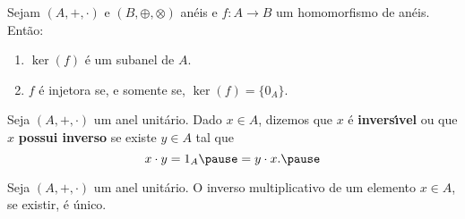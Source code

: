 \documentclass{beamer}
\begin{document}
    \begin{frame}
        \begin{proposicao}
            Sejam $(A, +, \cdot)$ e $(B, \oplus, \otimes)$ anéis \pause e $f : A \to B$ um homomorfismo de anéis. \pause Então:\pause
            \begin{enumerate}[label={\roman*})]
                \item $\ker(f)$ é um subanel de $A$.\pause

                \vspace{.5cm}

                \item $f$ é injetora \pause se, e somente se, \pause $\ker(f) = \{0_A\}$.\pause

                \vspace{.5cm}
            \end{enumerate}
        \end{proposicao}
    \end{frame}

    \begin{frame}
        \begin{definicao}
            Seja $(A, +, \cdot)$ um anel unitário. \pause Dado $x \in A$, \pause dizemos que $x$ é \textbf{invers{\'\i}vel} \pause ou que $x$ \textbf{possui inverso} \pause se existe $y \in A$ \pause tal que\pause
            \[
                x \cdot y = 1_A \pause = y \cdot x.\pause
            \]
        \end{definicao}
    \end{frame}

    \begin{frame}
        \begin{proposicao}
            Seja $(A, +, \cdot)$ um anel unitário. \pause O inverso multiplicativo de um elemento $x \in A$, \pause se existir, \pause é \'unico.\pause
        \end{proposicao}
    \end{frame}
\end{document}
